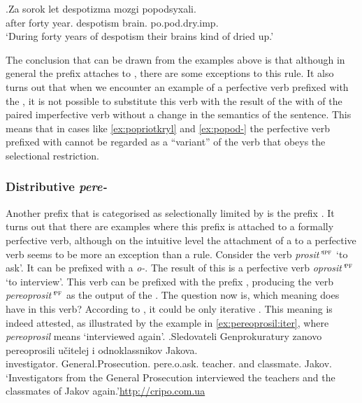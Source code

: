 \exg.\label{ex:popod-imp}Za sorok let despotizma mozgi popodsyxali.\\
after forty year. despotism brain. po.pod.dry.imp.\\
\trans `During forty years of despotism their brains kind of dried up.'

The conclusion that can be drawn from the examples above is that although in general the  prefix  attaches to , there are some exceptions to this rule. It also turns out that when we encounter an example of a perfective verb prefixed with the  , it is not possible to substitute this verb with the result of the  with  of the paired imperfective verb without a change in the semantics of the sentence. This means that in cases like \ref{ex:popriotkryl} and \ref{ex:popod-} the perfective verb prefixed with  cannot be regarded as a ``variant'' of the verb that obeys the selectional restriction.
 
\subsubsection{Distributive \textit{pere-}}\largerpage[2]
Another prefix that is categorised as selectionally limited by \citet{Tatevosov:09} is the  prefix . It turns out that there are examples where this prefix is attached to a formally perfective verb, although on the intuitive level the attachment of a   to a perfective verb seems to be more an exception than a rule. Consider the verb \textit{prosit'}$^{\textsc{ipf}}$ `to ask'. It can be prefixed with a  \textit{o-}. The result of this  is a perfective verb \textit{oprosit'}$^{\textsc{pf}}$ `to interview'. This verb can be prefixed with the prefix , producing the verb \textit{pereoprosit'}$^{\textsc{pf}}$ as the output of the . The question now is, which meaning does  have in this verb? According to \citet{Tatevosov:09}, it could be only iterative . This meaning is indeed attested, as illustrated by the example in \ref{ex:pereoprosil:iter}, where \textit{pereoprosil} means `interviewed again'.
\exg.\label{ex:pereoprosil:iter}Sledovateli Genprokuratury zanovo pereoprosili u\v{c}itelej i odnoklassnikov Jakova.\\
investigator. General.Prosecution.  pere.o.ask. teacher. and classmate. Jakov.\\
\trans `Investigators from the General Prosecution interviewed the teachers and the classmates of Jakov again.'\hbox{}\hfill\hbox{\url{http://cripo.com.ua}}


